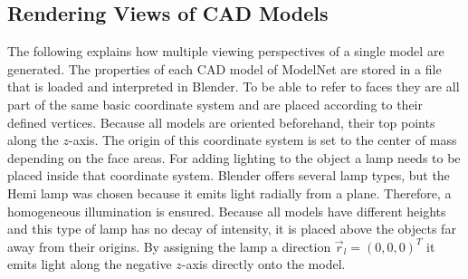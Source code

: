\subsection{Rendering Views of CAD Models}
\label{sec:dataset-rendering}
The following explains how multiple viewing perspectives of a single model are generated.
The properties of each CAD model of ModelNet are stored in a file that is loaded and interpreted in Blender.
To be able to refer to faces they are all part of the same basic coordinate system and are placed according to their defined vertices.
Because all models are oriented beforehand, their top points along the $z$-axis.
The origin of this coordinate system is set to the center of mass depending on the face areas.
For adding lighting to the object a lamp needs to be placed inside that coordinate system.
Blender offers several lamp types, but the Hemi lamp was chosen because it emits light radially from a plane.
Therefore, a homogeneous illumination is ensured.
Because all models have different heights and this type of lamp has no decay of intensity, it is placed above the objects far away from their origins.
By assigning the lamp a direction $\vec{r}_l = (0,0,0)^T$ it emits light along the negative $z$-axis directly onto the model.

